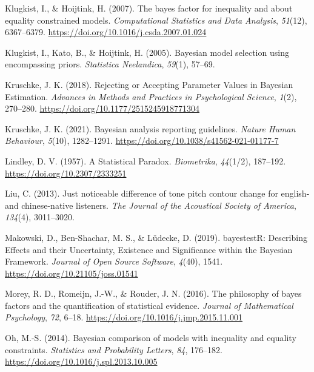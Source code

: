 \documentclass[
  doc,
  floatsintext,
  longtable,
  nolmodern,
  notxfonts,
  notimes,
  colorlinks=true,linkcolor=blue,citecolor=blue,urlcolor=blue]{apa7}
\newlength{\cslhangindent}
\newenvironment{CSLReferences}[2] %
 {\begin{list}{}{%
  \setlength{\itemindent}{0pt}
  \setlength{\leftmargin}{0pt}
  \setlength{\parsep}{0pt}
  \ifodd #1
   \setlength{\leftmargin}{\cslhangindent}
   \setlength{\itemindent}{-1\cslhangindent}
  \fi
  \setlength{\itemsep}{#2\baselineskip}}}
 {\end{list}}
\begin{document}
\begin{CSLReferences}{1}{0}
Klugkist, I., \& Hoijtink, H. (2007). The bayes factor for inequality
and about equality constrained models. \emph{Computational Statistics
and Data Analysis}, \emph{51}(12), 6367--6379.
\url{https://doi.org/10.1016/j.csda.2007.01.024}

Klugkist, I., Kato, B., \& Hoijtink, H. (2005). Bayesian model selection
using encompassing priors. \emph{Statistica Neelandica}, \emph{59}(1),
57--69.

Kruschke, J. K. (2018). Rejecting or {Accepting Parameter Values} in
{Bayesian Estimation}. \emph{Advances in Methods and Practices in
Psychological Science}, \emph{1}(2), 270--280.
\url{https://doi.org/10.1177/2515245918771304}

Kruschke, J. K. (2021). Bayesian analysis reporting guidelines.
\emph{Nature Human Behaviour}, \emph{5}(10), 1282--1291.
\url{https://doi.org/10.1038/s41562-021-01177-7}

Lindley, D. V. (1957). A {Statistical Paradox}. \emph{Biometrika},
\emph{44}(1/2), 187--192. \url{https://doi.org/10.2307/2333251}

Liu, C. (2013). Just noticeable difference of tone pitch contour change
for english-and chinese-native listeners. \emph{The Journal of the
Acoustical Society of America}, \emph{134}(4), 3011--3020.

Makowski, D., Ben-Shachar, M. S., \& Lüdecke, D. (2019). {bayestestR:
Describing Effects and their Uncertainty, Existence and Significance
within the Bayesian Framework}. \emph{Journal of Open Source Software},
\emph{4}(40), 1541. \url{https://doi.org/10.21105/joss.01541}

Morey, R. D., Romeijn, J.-W., \& Rouder, J. N. (2016). The philosophy of
bayes factors and the quantification of statistical evidence.
\emph{Journal of Mathematical Psychology}, \emph{72}, 6--18.
\url{https://doi.org/10.1016/j.jmp.2015.11.001}

Oh, M.-S. (2014). Bayesian comparison of models with inequality and
equality constraints. \emph{Statistics and Probability Letters},
\emph{84}, 176--182. \url{https://doi.org/10.1016/j.spl.2013.10.005}


\end{CSLReferences}
\end{document}
